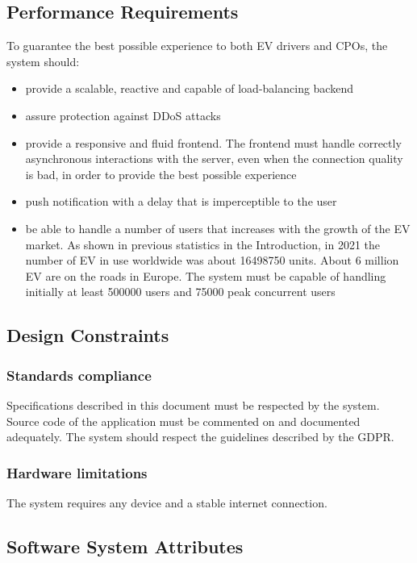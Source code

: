 \subsection{Performance Requirements}
To guarantee the best possible experience to both EV drivers and CPOs, the system should:
\begin{itemize}
    \item provide a scalable, reactive and capable of load-balancing backend
    \item assure protection against DDoS attacks
    \item provide a responsive and fluid frontend. The frontend must handle correctly asynchronous interactions
          with the server, even when the connection quality is bad, in order to provide the best possible experience
    \item push notification with a delay that is imperceptible to the user
    \item be able to handle a number of users that increases with the growth of the EV market. As shown in previous statistics in the Introduction, in 2021 the number of EV in use worldwide was about 16498750 units. About 6 million EV are on the roads in Europe. The system must be capable of handling initially at least 500000 users and 75000 peak concurrent users
\end{itemize}

\subsection{Design Constraints}


\subsubsection{Standards compliance}
Specifications described in this document must be respected by the system.
Source code of the application must be commented on and documented adequately.
The system should respect the guidelines described by the GDPR.

\subsubsection{Hardware limitations}
The system requires any device and a stable internet connection.

\subsection{Software System Attributes}
